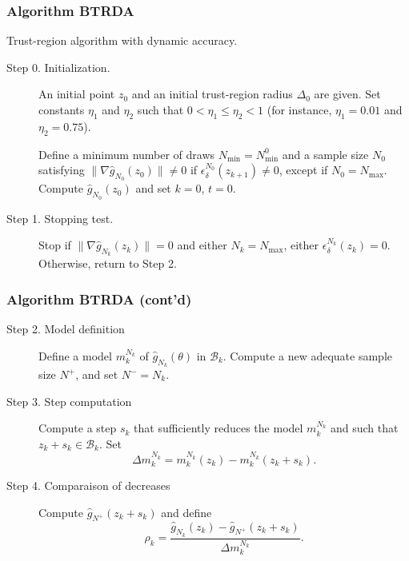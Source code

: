 \documentclass{beamer}
\begin{document}
\begin{frame}
\frametitle{Algorithm BTRDA}

Trust-region algorithm with dynamic accuracy.

\mbox{}

\begin{description}
\item[Step 0. Initialization.]

An initial point $z_0$ and an initial trust-region radius $\Delta_0$ are given.
Set constants $\eta_1$ and $\eta_2$ such that $0 < \eta_1 \leq
\eta_2 < 1$ (for instance, $\eta_1 = 0.01$ and $\eta_2 = 0.75$).

Define a minimum number of draws $N_{\min} = N^0_{\min}$ and a sample size $N_0$ satisfying $\| \nabla \hat{g}_{N_0} (z_0) \| \ne 0$ if $\epsilon_{\delta}^{N_0}(z_{k+1}) \ne
0$, except if $N_0 = N_{\max}$.
Compute $\hat{g}_{N_0}(z_0)$ and set $k = 0$, $t = 0$.
\item[Step 1. Stopping test.]
Stop if $\| \nabla \hat{g}_{N_{k}}(z_{k})\| = 0$ and either
$N_k = N_{\max}$, either $\epsilon_{\delta}^{N_k}(z_k) = 0$.
Otherwise, return to Step 2.
\end{description}

\end{frame}

\begin{frame}
\frametitle{Algorithm BTRDA (cont'd)}

\begin{description}
\item[Step 2. Model definition]
Define a model $m_k^{N_k}$ of $\hat{g}_{N_k}(\theta)$ in $\mathcal{B}_k$.
Compute a new adequate sample size $N^{+}$, and set $N^- = N_k$.
\item[Step 3. Step computation]
Compute a step $s_k$ that sufficiently reduces the model $m_k^{N_k}$ and such that  $z_k + s_k \in \mathcal{B}_k$.
Set
\[ \Delta m_k^{N_k} = m_k^{N_k}(z_k) - m_k^{N_k}(z_k+s_k). \]
\item[Step 4. Comparaison of decreases]
Compute $\hat{g}_{N^+} (z_k + s_k)$ and define
\[
\rho_k = \frac{\hat{g}_{N_k}(z_k) - \hat{g}_{N^+}(z_k+s_k)}
{\Delta m_k^{N_k}}.
\]
\end{description}

\end{frame}
\end{document}
